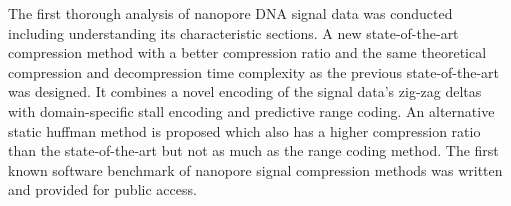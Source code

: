 The first thorough analysis of nanopore DNA signal data was conducted including
understanding its characteristic sections. A new state-of-the-art compression
method with a better compression ratio and the same theoretical compression and
decompression time complexity as the previous state-of-the-art was designed. It
combines a novel encoding of the signal data's zig-zag deltas with
domain-specific stall encoding and predictive range coding. An alternative
static huffman method is proposed which also has a higher compression ratio than
the state-of-the-art but not as much as the range coding method. The first known
software benchmark of nanopore signal compression methods was written and
provided for public access.
